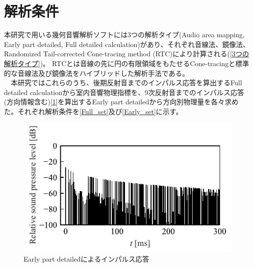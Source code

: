 \section{解析条件}
本研究で用いる幾何音響解析ソフトには3つの解析タイプ(Audio area mapping, Early part detailed, Full detailed calculation)があり、それぞれ音線法、鏡像法、Randomized Tail-corrected Cone-tracing method (RTC)により計算される(\ref{3つの解析タイプ})。
RTCとは音線の先に円の有限領域をもたせるCone-tracingと標準的な音線法及び鏡像法をハイブリッドした解析手法である。
\\　本研究ではこれらのうち、後期反射音までのインパルス応答を算出するFull detailed calculationから室内音響物理指標を、9次反射音までのインパルス応答(方向情報含む)[\ref{fig:Early_IR}]を算出するEarly part detailedから方向別物理量を各々求めた。それぞれ解析条件を\ref{Full_set}及び\ref{Early_set}に示す。
\\
\begin{table}[htbp]
\centering
\caption{解析手法と出力データ}
\label{3つの解析タイプ}
\end{table}

\begin{figure}[htbp]
    \centering
    \includegraphics[keepaspectratio,scale=1]{02_att/Early_IR.pdf}
    \caption{\hspace{1mm}Early part detailedによるインパルス応答}
    \label{fig:Early_IR}
\end{figure}

